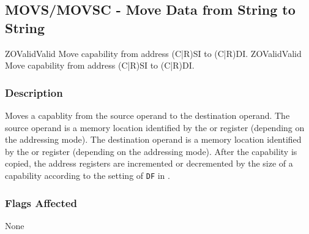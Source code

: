 \clearpage
{}
{}
\subsection*{MOVS/MOVSC - Move Data from String to String}

\begin{x86opcodetable}
  {ZO}{Valid}{Valid}
  {Move capability from address (C|R)SI to (C|R)DI.}
  {ZO}{Valid}{Valid}
  {Move capability from address (C|R)SI to (C|R)DI.}
\end{x86opcodetable}

\begin{x86opentable}
\end{x86opentable}

\subsubsection*{Description}

Moves a capablity from the source operand to the destination operand.
The source operand is a memory location identified by the \RSI{} or
\CSI{} register (depending on the addressing mode).  The destination
operand is a memory location identified by the \RDI{} or \CDI{}
register (depending on the addressing mode).  After the capability is
copied, the address registers are incremented or decremented by the
size of a capability according to the setting of \texttt{DF} in
\RFLAGS{}.

\subsubsection*{Flags Affected}

None
